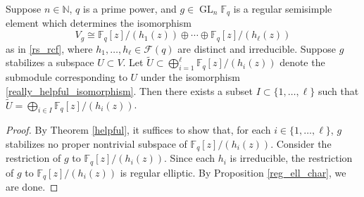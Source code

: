 \documentclass[Unicode,ALCO]{cedram}
\DeclareMathOperator{\GL}{GL}
\newcommand{\F}{\mathbb{F}}
\newcommand{\CF}{\mathcal{F}}
\newcommand{\N}{\mathbb{N}}
\begin{document}
\begin{corollary}
\label{really_helpful}
Suppose \(n \in \N\), \(q\) is a prime power, and \(g \in \GL_n \F_q\) is a regular semisimple element which determines the isomorphism
\begin{equation}
\label{really_helpful_isomorphism}
V_g
\cong
\F_q[z] / (h_1 (z)) \oplus \cdots \oplus \F_q[z] / (h_\ell (z))
\end{equation}
as in \eqref{rs_rcf}, where $h_1,\ldots,h_\ell \in \CF(q)$ are distinct and irreducible.
Suppose $g$ stabilizes a subspace $U \subset V$.
Let \(\widetilde{U} \subset \bigoplus_{i=1}^{\ell} \F_q[z] / (h_i(z))\) denote the submodule corresponding to \(U\) under the isomorphism \eqref{really_helpful_isomorphism}.
Then there exists a subset \(I \subset \{1,\ldots,\ell\}\) such that \(\widetilde{U} = \bigoplus_{i \in I} \F_q[z]/(h_i(z))\).
\end{corollary}

\begin{proof}
By Theorem \ref{helpful}, it suffices to show that, for each \(i \in \{1,\ldots,\ell\}\), \(g\) stabilizes no proper nontrivial subspace of $\F_q[z]/(h_i(z))$.
Consider the restriction of \(g\) to \(\F_q[z]/(h_i(z))\).
Since each $h_i$ is irreducible, the restriction of $g$ to $\F_q[z] / (h_i(z))$ is regular elliptic. By Proposition \ref{reg_ell_char}, we are done.
\end{proof}
\end{document}
